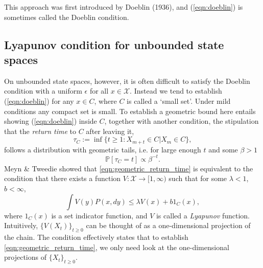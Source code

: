 \documentclass{article}
\newcommand{\ch}[1]{ \{#1_t\}_{t \geq 0} }
\newcommand{\X}{\mathcal{X}}
\begin{document}
\vspace{0.3cm}

This approach was first introduced by Doeblin (1936), and (\ref{eqn:doeblin}) is sometimes called the Doeblin condition.

\subsection{Lyapunov condition for unbounded state spaces}
On unbounded state spaces, however, it is often difficult to satisfy the Doeblin condition with a uniform $\epsilon$ for all $x \in \X$.  Instead we tend to establish (\ref{eqn:doeblin}) for any $x \in C$, where $C$ is called a `small set'.  Under mild conditions any compact set is small.  To establish a geometric bound here entails showing (\ref{eqn:doeblin}) inside $C$, together with another condition, the stipulation that the \emph{return time} to $C$ after leaving it, 
\begin{equation} \label{eqn:return}
\tau_C := \inf \{ t \geq 1 : X_{m+t} \in C | X_m \in C \},
\end{equation}
follows a distribution with geometric tails, i.e. for large enough $t$ and some $\beta > 1$
\begin{equation}
\mathbb{P}[\tau_C = t] \propto \beta^{-t}. \label{eqn:geometric_return_time}
\end{equation}
Meyn \& Tweedie showed that \eqref{eqn:geometric_return_time} is equivalent to the condition that there exists a function $V: \X \to [1,\infty)$ such that for some $\lambda<1$, $b < \infty$,
\begin{equation}
\int V(y)P(x,dy) \leq \lambda V(x) + b1_C(x), \label{eqn:lyapunov_condition}
\end{equation}
where $1_C(x)$ is a  set indicator function, and $V$  is called a \emph{Lyapunov} function.  Intuitively, $\{ V(X_t) \}_{t \geq 0}$ can be thought of as a one-dimensional projection of the chain.  The condition effectively states that to establish \eqref{eqn:geometric_return_time}, we only need look at the one-dimensional projections of $\ch{X}$.
\end{document}

